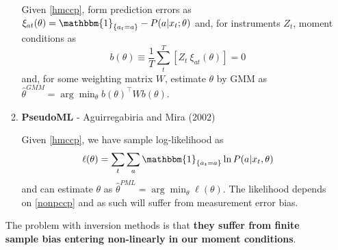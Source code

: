 \documentclass[11pt]{article}
\begin{document}
\begin{enumerate}
\begin{enumerate}
Given \eqref{hmccp}, form prediction errors as $ \xi_{at}(\theta) = \mathbbm{1}_{\{a_t = a\}} - P(a|x_t; \theta)$ and, for instruments $Z_t$, moment conditions as
\begin{equation*}
  b(\theta) \equiv \frac{1}{T}\sum_t^T[Z_t ~ \xi_{at}(\theta)] = 0
\end{equation*}
and, for some weighting matrix $W$, estimate $\theta$ by GMM as $\hat{\theta}^{GMM} = \arg \min_\theta b(\theta)^\intercal W b(\theta)$.

\item \textbf{PseudoML} - Aguirregabiria and Mira (2002)

Given \eqref{hmccp}, we have sample log-likelihood as
\begin{equation*}
  \ell(\theta) = \sum_t \sum_a \mathbbm{1}_{\{a_t = a\}} \ln P(a|x_t,\theta)
\end{equation*}
and can estimate $\theta$ as $\hat{\theta}^{PML} = \arg \min_\theta \ell(\theta)$. The likelihood depends on \eqref{nonpccp} and as such will suffer from measurement error bias.
	\end{enumerate}

The problem with inversion methods is that \textbf{they suffer from finite sample bias entering non-linearly in our moment conditions}.
	\end{enumerate}
\end{document}

